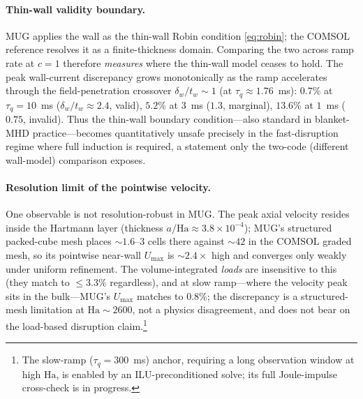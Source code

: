 \documentclass[11pt,letterpaper]{article}
\newcommand{\Ha}{\mathrm{Ha}}
\newcommand{\tq}{\tau_q}
\newcommand{\umax}{U_{\max}}
\begin{document}
\paragraph{Thin-wall validity boundary.} MUG applies the wall as the thin-wall
Robin condition \eqref{eq:robin}; the COMSOL reference resolves it as a
finite-thickness domain. Comparing the two across ramp rate at $c=1$ therefore
\emph{measures} where the thin-wall model ceases to hold. The peak wall-current
discrepancy grows monotonically as the ramp accelerates through the field-penetration
crossover $\delta_w/t_w\!\sim\!1$ (at $\tq\approx1.76$~ms):
$0.7\%$ at $\tq=10$~ms ($\delta_w/t_w\!\approx\!2.4$, valid),
$5.2\%$ at $3$~ms ($1.3$, marginal),
$13.6\%$ at $1$~ms ($0.75$, invalid). Thus the thin-wall boundary condition---also
standard in blanket-MHD practice---becomes quantitatively unsafe precisely in the
fast-disruption regime where full induction is required, a statement only the
two-code (different wall-model) comparison exposes.

\paragraph{Resolution limit of the pointwise velocity.} One observable is not
resolution-robust in MUG. The peak axial velocity resides inside the Hartmann layer
(thickness $a/\Ha\approx3.8\times10^{-4}$); MUG's structured packed-cube mesh places
$\sim\!1.6$--$3$ cells there against $\sim\!42$ in the COMSOL graded mesh, so its
pointwise near-wall $\umax$ is $\sim\!2.4\times$ high and converges only weakly under
uniform refinement. The volume-integrated \emph{loads} are insensitive to this (they
match to $\le3.3\%$ regardless), and at slow ramp---where the velocity peak sits in
the bulk---MUG's $\umax$ matches to $0.8\%$; the discrepancy is a structured-mesh
limitation at $\Ha\!\sim\!2600$, not a physics disagreement, and does not bear on the
load-based disruption claim.\footnote{The slow-ramp ($\tq=300$~ms) anchor, requiring
a long observation window at high $\Ha$, is enabled by an ILU-preconditioned solve;
its full Joule-impulse cross-check is in progress.}

\end{document}
